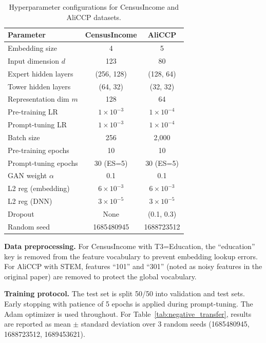 \documentclass[review,anonymous]{acmart}
\begin{document}
\begin{table}[t]
  \centering
  \caption{Hyperparameter configurations for CensusIncome and AliCCP datasets.}
  \label{tab:hyperparams}
  \begin{tabular}{lcc}
    \toprule
    \textbf{Parameter} & \textbf{CensusIncome} & \textbf{AliCCP} \\
    \midrule
    Embedding size        & 4    & 5 \\
    Input dimension $d$   & 123  & 80 \\
    Expert hidden layers  & (256, 128) & (128, 64) \\
    Tower hidden layers   & (64, 32)   & (32, 32) \\
    Representation dim $m$ & 128  & 64 \\
    Pre-training LR       & $1\times10^{-3}$ & $1\times10^{-4}$ \\
    Prompt-tuning LR      & $1\times10^{-3}$ & $1\times10^{-4}$ \\
    Batch size            & 256  & 2{,}000 \\
    Pre-training epochs   & 10   & 10 \\
    Prompt-tuning epochs  & 30 (ES=5) & 30 (ES=5) \\
    GAN weight $\alpha$   & 0.1  & 0.1 \\
    L2 reg (embedding)    & $6\times10^{-3}$ & $6\times10^{-3}$ \\
    L2 reg (DNN)          & $3\times10^{-5}$ & $3\times10^{-5}$ \\
    Dropout               & None & (0.1, 0.3) \\
    Random seed           & 1685480945 & 1688723512 \\
    \bottomrule
  \end{tabular}
\end{table}

\textbf{Data preprocessing.} For CensusIncome with T3=Education, the
``education'' key is removed from the feature vocabulary to prevent
embedding lookup errors. For AliCCP with STEM, features ``101''
and ``301'' (noted as noisy features in the original paper) are removed
to protect the global vocabulary.

\textbf{Training protocol.} The test set is split 50/50 into validation and test
sets. Early stopping with patience of 5 epochs is applied during prompt-tuning.
The Adam optimizer is used throughout. For Table~\ref{tab:negative_transfer},
results are reported as mean $\pm$ standard deviation over 3 random seeds
(1685480945, 1688723512, 1689453621).
\end{document}
